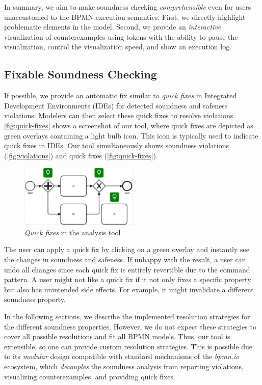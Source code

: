 \documentclass[runningheads]{llncs}
\begin{document}
In summary, we aim to make soundness checking \textit{comprehensible} even for users unaccustomed to the BPMN execution semantics.
First, we directly highlight problematic elements in the model.
Second, we provide an \textit{interactive} visualization of counterexamples using tokens with the ability to pause the visualization, control the visualization speed, and show an execution log.

\subsection{Fixable Soundness Checking} \label{subsec:fixable-checking}

If possible, we provide an automatic fix similar to \textit{quick fixes} in Integrated Development Environments (IDEs) for detected soundness and safeness violations.
Modelers can then select these quick fixes to resolve violations.
\autoref{fig:quick-fixes} shows a screenshot of our tool, where quick fixes are depicted as green overlays containing a light bulb icon.
This icon is typically used to indicate quick fixes in IDEs.
Our tool simultaneously shows soundness violations (\autoref{fig:violations}) and quick fixes (\autoref{fig:quick-fixes}).

\begin{figure}[ht]
	\centering
	\includegraphics[width=0.5\textwidth]{images/quickfixes}
	\caption{\textit{Quick fixes} in the analysis tool}
	\label{fig:quick-fixes}
\end{figure}

The user can apply a quick fix by clicking on a green overlay and instantly see the changes in soundness and safeness.
If unhappy with the result, a user can undo all changes since each quick fix is entirely revertible due to the command pattern.
A user might not like a quick fix if it not only fixes a specific property but also has unintended side effects.
For example, it might invalidate a different soundness property.

In the following sections, we describe the implemented resolution strategies for the different soundness properties.
However, we do not expect these strategies to cover all possible resolutions and fit all BPMN models.
Thus, our tool is extensible, so one can provide custom resolution strategies.
This is possible due to its \textit{modular} design compatible with standard mechanisms of the \textit{bpmn.io} ecosystem, which \textit{decouples} the soundness analysis from reporting violations, visualizing counterexamples, and providing quick fixes.
\end{document}
